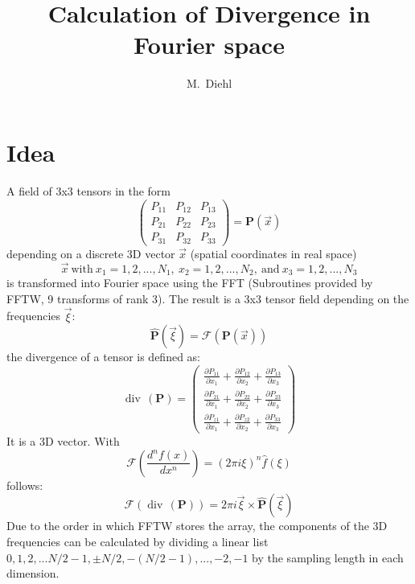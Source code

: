 \documentclass[12pt,numbers,sort&compress]{article}
\title{Calculation of Divergence in Fourier space}
\author{M.~Diehl}
\newcommand{\tnsr}[1]{\ensuremath{\bm{#1}}}
\begin{document}
\maketitle
\section{Idea}
A field of 3x3 tensors in the form
\begin{equation}
\begin{pmatrix} P_{11} & P_{12} & P_{13}\\ P_{21} & P_{22} & P_{23} \\ P_{31} & P_{32}& P_{33} \end{pmatrix} = \tnsr{P}(\vec{x})
\end{equation}
depending on a discrete 3D vector $\vec x$ (spatial coordinates in real space)
\begin{equation}
\vec x \mathrm{~with~} x_1=1,2,...,N_1\mathrm{,~}x_2=1,2,...,N_2\mathrm{,~and~}x_3=1,2,...,N_3
\end{equation}
is transformed into Fourier space using the FFT (Subroutines provided by FFTW, 9 transforms of rank 3). The result is a 3x3 tensor field depending on the frequencies $\vec \xi$:
\begin{equation}
\hat{\tnsr P}(\vec \xi) = \mathcal{F}\left( \tnsr P(\vec x) \right)
\end{equation}
the divergence of a tensor is defined as:
\begin{equation}
\operatorname{div}\,(\tnsr P) = 
\begin{pmatrix}
\frac{\partial P_{11}}{\partial x_1} +\frac{\partial P_{12}}{\partial x_2} +\frac{\partial P_{13}}{\partial x_3}\\[6pt]
\frac{\partial P_{21}}{\partial x_1} +\frac{\partial P_{22}}{\partial x_2} +\frac{\partial P_{23}}{\partial x_3}\\[6pt]
\frac{\partial P_{z1}}{\partial x_1} +\frac{\partial P_{z2}}{\partial x_2} +\frac{\partial P_{33}}{\partial x_3}
\end{pmatrix}
\end{equation}
It is a 3D vector. With
\begin{equation}\label{div}
\mathcal{F}(\frac{d^n f(x)}{dx^n}) = (2\pi i\xi)^n  \hat{f}(\xi)
\end{equation}
follows:
\begin{equation}
\mathcal{F}\left(\operatorname{div}\,(\tnsr P) \right) = 2\pi i\vec \xi \times \hat{\tnsr P}(\vec \xi)
\end{equation}
Due to the order in which FFTW stores the array, the components of the 3D frequencies can be calculated by dividing a linear list $0,1,2,...N/2-1,\pm N/2,-(N/2-1),...,-2,-1$ by the sampling length in each dimension.
 
\end{document}

